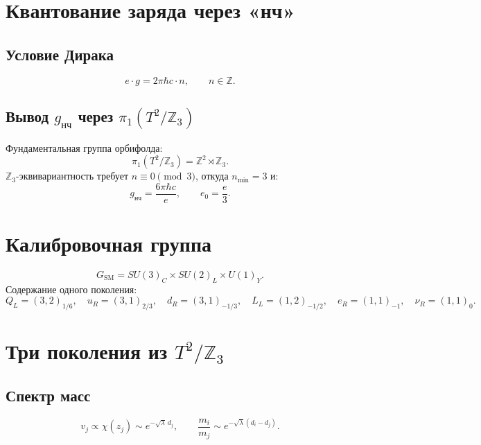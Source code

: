 \documentclass[11pt,letterpaper]{article}
\begin{document}
\section{Квантование заряда через «нч»}

\subsection{Условие Дирака}
\begin{equation}
e \cdot g = 2\pi \hbar c \cdot n, \qquad n \in \mathbb{Z}.
\end{equation}

\subsection{Вывод $g_{\text{нч}}$ через $\pi_1(T^2/\mathbb{Z}_3)$}
Фундаментальная группа орбифолда:
\begin{equation}
\pi_1(T^2/\mathbb{Z}_3) = \mathbb{Z}^2 \rtimes \mathbb{Z}_3 .
\end{equation}
$\mathbb{Z}_3$-эквивариантность требует $n \equiv 0 \pmod{3}$, откуда $n_{\min} = 3$ и:
\begin{equation}
g_{\text{нч}} = \frac{6\pi\hbar c}{e}, \qquad e_0 = \frac{e}{3} .
\end{equation}

\section{Калибровочная группа}
\begin{equation}
G_{\text{SM}} = SU(3)_C \times SU(2)_L \times U(1)_Y .
\end{equation}
Содержание одного поколения:
\begin{equation}
Q_L = (3, 2)_{1/6}, \quad u_R = (3, 1)_{2/3}, \quad d_R = (3, 1)_{-1/3}, \quad L_L = (1, 2)_{-1/2}, \quad e_R = (1, 1)_{-1}, \quad \nu_R = (1, 1)_{0} .
\end{equation}

\section{Три поколения из $T^2/\mathbb{Z}_3$}

\subsection{Спектр масс}
\begin{equation}
v_j \propto \chi(z_j) \sim e^{-\sqrt{\lambda}\, d_j}, \qquad \frac{m_i}{m_j} \sim e^{-\sqrt{\lambda}(d_i - d_j)} .
\end{equation}
\end{document}
